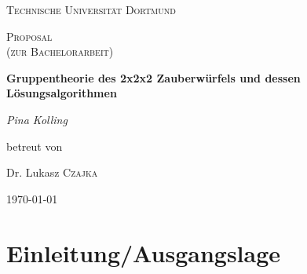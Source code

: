 \documentclass[12pt,a4paper, usenames, dvipsnames]{article}
\begin{document}
\begin{titlepage}
	\centering
	\vspace*{4cm}
	{\scshape\LARGE Technische Universität Dortmund \par}
	\vspace{1cm}
	{\scshape\Large Proposal \\
	(zur Bachelorarbeit) \par}
	\vspace{1.5cm}
	{\huge\bfseries  Gruppentheorie des 2x2x2 Zauberwürfels und dessen Lösungsalgorithmen \par}
	\vspace{2cm}
	{\Large\itshape Pina Kolling\par}
	\vfill
	betreut von\par
	Dr. Lukasz \textsc{Czajka}

	\vfill

	{\large \today\par}
\end{titlepage}


\tableofcontents

\thispagestyle{empty} 



\newpage

\setcounter{page}{1} 



















\section{Einleitung/Ausgangslage}
\end{document}

